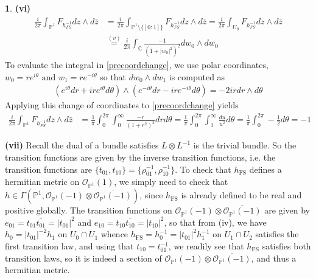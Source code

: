 \documentclass[10.5pt]{article}
\theoremstyle{definition}
\newtheorem{pb}{}
\newcommand{\set}[1]{\{#1\}}
\newcommand{\abs}[1]{\left\vert#1\right\vert}
\newcommand{\tand}{\text{ and }}
\begin{document}
\begin{pb}
        \textbf{(vi)}
        \begin{align}
            \frac{i}{2\pi}\int_{\mathbb{P}^1} F_{h^{-1}_{FS}}dz \wedge d\bar{z} &=  \frac{i}{2\pi}\int_{\mathbb{P}^1 \setminus \set{[0:1]}} F_{h^{-1}_{FS}}dz \wedge d\bar{z} =  \frac{i}{2\pi}\int_{U_0} F_{h^{-1}_{FS}}dz \wedge d\bar{z} \\ &\overset{(v)}{=} \frac{i}{2\pi}\int_{\mathbb{C}} \frac{-1}{(1 + \abs{w_0}^2)^2}dw_0 \wedge d\overline{w_0} \label{precoordchange}
        \end{align}
        To evaluate the integral in \eqref{precoordchange}, we use polar coordinates, \(w_0 = re^{i\theta} \tand w_1 = re^{-i\theta}\) so that \(dw_0 \wedge dw_1\) is computed as
        \begin{align}
            (e^{i\theta}dr +ire^{i\theta}d\theta)\wedge(e^{-i\theta}dr - ire^{-i\theta}d\theta) = -2ir dr\wedge d\theta
        \end{align}
        Applying this change of coordinates to \eqref{precoordchange} yields
        \begin{align}
            \frac{i}{2\pi}\int_{\mathbb{P}^1} F_{h^{-1}_{FS}}dz \wedge d\bar{z} &= \frac{1}{\pi}\int_0^{2\pi}\int_0^\infty \frac{-r}{(1 + r^2)^2}drd\theta = \frac{1}{\pi}\int_0^{2\pi} \int_1^\infty \frac{du}{u^2}d\theta = \frac{1}{\pi}\int_0^{2\pi} -\frac12d\theta = -1 \label{computeint}
        \end{align}

        \textbf{(vii)} Recall the dual of a bundle satisfies \(L \otimes L^{-1}\) is the trivial bundle. So the transition functions are given by the inverse transition functions, i.e. the transition functions are \(\set{t_{01}, t_{10}} = \set{\rho_{01}^{-1}, \rho_{10}^{-1}}\). To check that \(h_{\text{FS}}\) defines a hermitian metric on \(\mathcal{O}_{\mathbb{P}^1}(1)\), we simply need to check that \(h \in \Gamma(\mathbb{P}^1,\mathcal{O}_{\mathbb{P}^1}(-1)\otimes \overline{\mathcal{O}_{\mathbb{P}^1}(-1)})\), since \(h_{\text{FS}}\) is already defined to be real and positive globally. The transition functions on \(\mathcal{O}_{\mathbb{P}^1}(-1)\otimes \overline{\mathcal{O}_{\mathbb{P}^1}(-1)}\) are given by \(e_{01} = t_{01}\overline{t_{01}} = \abs{t_{01}}^2\) and \(e_{10} = t_{10} \overline{t_{10}} = \abs{t_{10}}^2\), so that from (iv), we have \(h_0 = \abs{t_{01}}^{-2}h_1\) on \(U_0 \cap U_1\) whence \(h_{\text{FS}} = h_0^{-1} = \abs{t_{01}}^2h_1^{-1}\) on \(U_1 \cap U_2\) satisfies the first transition law, and using that \(t_{10} = t_{01}^{-1}\), we readily see that \(h_{\text{FS}}\) satisfies both transition laws, so it is indeed a section of \(\mathcal{O}_{\mathbb{P}^1}(-1)\otimes \overline{\mathcal{O}_{\mathbb{P}^1}(-1)}\), and thus a hermitian metric.


\end{pb}
\end{document}

